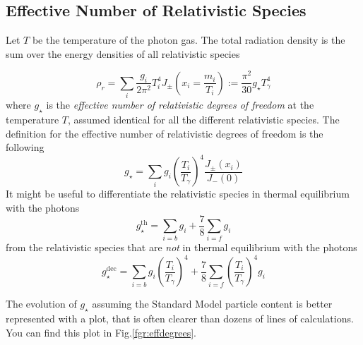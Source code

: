 \subsection{Effective Number of Relativistic Species}

Let $T$ be the temperature of the photon gas. The total radiation density is the sum over the energy densities of all relativistic species

\begin{equation}
    \rho_{r} = \sum_{i}\frac{g_{i}}{2\pi^{2}}T_{i}^{4}J_{\pm}\left(x_{i}=\frac{m_{i}}{T_{i}}\right) := \frac{\pi^{2}}{30}g_{\star}T_{\gamma}^{4}
\end{equation}
where $g_{\star}$ is the \emph{effective number of relativistic degrees of freedom} at the temperature $T$, assumed identical for all the different relativistic species. The definition for the effective number of relativistic degrees of freedom is the following
\begin{equation}
    \boxed{
        g_{\star} = \sum_{i}g_{i}\left(\frac{T_{i}}{T_{\gamma}}\right)^{4}\frac{J_{\pm}(x_{i})}{J_{-}(0)}
    }
\end{equation}
It might be useful to differentiate the relativistic species in thermal equilibrium with the photons 
\begin{equation}
    g_{\star}^{\text{th}} = \sum_{i=b}g_{i}+ \frac{7}{8}\sum_{i=f}g_{i}
\end{equation}
from the relativistic species that are \emph{not} in thermal equilibrium with the photons
\begin{equation}
    g_{\star}^{\text{dec}} = \sum_{i=b}g_{i}\left(\frac{T_{i}}{T_{\gamma}}\right)^{4} + \frac{7}{8}\sum_{i=f}\left(\frac{T_{i}}{T_{\gamma}}\right)^{4}g_{i}
\end{equation}
\par The evolution of $g_{\star}$ assuming the Standard Model particle content is better represented with a plot, that is often clearer than dozens of lines of calculations. You can find this plot in Fig.\ref{fgr:effdegrees}.
